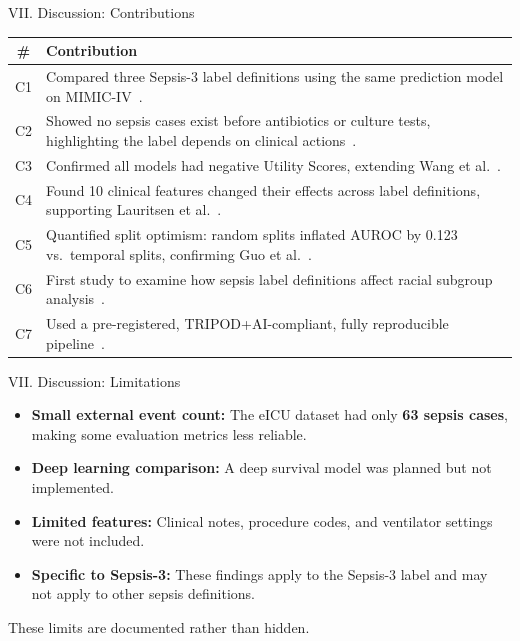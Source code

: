 \begin{frame}{VII. Discussion: Contributions}
\footnotesize\renewcommand{\arraystretch}{1.15}
\begin{center}
\begin{tabular}{cp{11cm}}
\toprule
\textbf{\#} & \textbf{Contribution} \\
\midrule
C1 & Compared three Sepsis-3 label definitions using the same prediction
     model on MIMIC-IV~\cite{cohen2024subtle}. \\
C2 & Showed no sepsis cases exist before antibiotics or culture tests,
     highlighting the label depends on clinical
     actions~\cite{kamran2024evaluation}. \\
C3 & Confirmed all models had negative Utility Scores, extending
     Wang et al.~\cite{wang2025srpm}. \\
C4 & Found 10 clinical features changed their effects across label
     definitions, supporting Lauritsen et al.~\cite{lauritsen2021framing}. \\
C5 & Quantified split optimism: random splits inflated AUROC by 0.123
     vs.\ temporal splits, confirming Guo et al.~\cite{guo2022temporal}. \\
C6 & First study to examine how sepsis label definitions affect racial
     subgroup analysis~\cite{wang2022equity}. \\
C7 & Used a pre-registered, TRIPOD+AI-compliant, fully reproducible
     pipeline~\cite{collins2024tripodai}. \\
\bottomrule
\end{tabular}
\end{center}
\end{frame}


\begin{frame}{VII. Discussion: Limitations}
\begin{itemize}
  \item \textbf{Small external event count:} The eICU dataset had only
        \textbf{63 sepsis cases}, making some evaluation metrics less
        reliable.
  \item \textbf{Deep learning comparison:} A deep survival model was planned
        but not implemented.
  \item \textbf{Limited features:} Clinical notes, procedure codes, and
        ventilator settings were not included.
  \item \textbf{Specific to Sepsis-3:} These findings apply to the Sepsis-3
        label and may not apply to other sepsis definitions.
\end{itemize}

\vspace{8pt}
\begin{exampleblock}{}
  \centering These limits are documented rather than hidden.
\end{exampleblock}
\end{frame}


